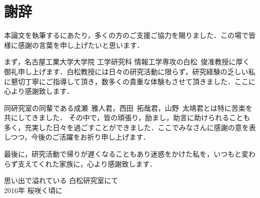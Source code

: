 \chapter*{謝辞}
本論文を執筆するにあたり，多くの方のご支援ご協力を賜りました．この場で皆様に感謝の言葉を申し上げたいと思います．

まず，名古屋工業大学大学院 工学研究科 情報工学専攻の白松~俊准教授に厚く御礼申し上げます．白松教授には日々の研究活動に限らず，研究経験の乏しい私に懇切丁寧にご指導して頂き，数多くの貴重な体験もさせて頂きました．ここに心より感謝致します．

同研究室の同輩である成瀬~雅人君，西田~拓哉君，山野~太靖君とは特に苦楽を共にしてきました．
その中で，皆の頑張り，励まし，助言に助けられることも多く，充実した日々を過ごすことができました．ここでみなさんに感謝の意を表しつつ，今後のご活躍をお祈り申し上げます．

最後に，研究活動で帰りが遅くなることもあり迷惑をかけた私を，いつもと変わらず支えてくれた家族に，心より感謝致します．

\vspace*{4.5mm}

\begin{flushright}
思い出で溢れている 白松研究室にて \\
2016年 桜咲く頃に \\
\vspace*{1.8mm}
\end{flushright}
